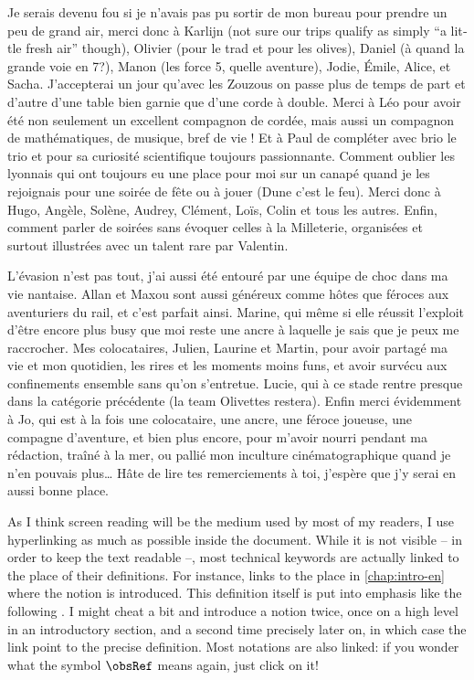 Je serais devenu fou si je n’avais pas pu sortir de mon bureau pour prendre un peu de grand
air, merci donc à Karlijn (\foreignlanguage{english}{not sure our trips
qualify as simply “a little fresh air” though}),
Olivier (pour le trad et pour les olives), Daniel (à quand la grande voie en 7?),
Manon (les force 5, quelle aventure), Jodie, Émile, Alice,
et Sacha. J’accepterai un jour qu’avec les Zouzous on passe plus de temps
de part et d’autre d’une table bien garnie que d’une corde à double.
Merci à Léo pour avoir été non seulement un excellent compagnon de cordée, mais aussi un
compagnon de mathématiques, de musique, bref de vie ! Et à Paul de compléter avec brio
le trio et pour sa curiosité scientifique toujours passionnante.
Comment oublier les lyonnais qui ont toujours eu une place pour moi sur un canapé
quand je les rejoignais pour une soirée de fête ou à jouer (Dune c’est le feu).
Merci donc à Hugo, Angèle, Solène, Audrey, Clément, Loïs, Colin
et tous les autres. 
Enfin, comment parler de soirées sans évoquer celles à la Milleterie, organisées et
surtout illustrées avec un talent rare par Valentin.

L’évasion n’est pas tout, j’ai aussi été entouré par une équipe de choc dans ma vie nantaise.
Allan et Maxou sont aussi généreux comme hôtes que féroces aux aventuriers du rail, et
c’est parfait ainsi.
Marine, qui même si elle réussit l’exploit d’être encore plus busy que moi reste une ancre
à laquelle je sais que je peux me raccrocher.
Mes colocataires, Julien, Laurine et Martin, pour avoir partagé ma
vie et mon quotidien, les rires et les moments moins funs, et avoir survécu aux confinements
ensemble sans qu’on s’entretue. Lucie, qui à ce stade rentre
presque dans la catégorie précédente (la team Olivettes restera).
Enfin merci évidemment à Jo, qui est à la fois une colocataire, une ancre, une féroce joueuse,
une compagne d’aventure, et bien plus encore, pour m’avoir nourri pendant ma rédaction,
traîné à la mer, ou pallié mon inculture cinématographique quand je n’en pouvais plus…
Hâte de lire tes remerciements à toi, j’espère que j’y serai en aussi bonne place.



As I think screen reading will be the medium
used by most of my readers, I use hyperlinking as much as possible
inside the document.
While it is not visible – in order to keep the text readable –,
most technical keywords are actually linked to the
place of their definitions. For instance,  links to
the place in \cref{chap:intro-en} where the notion is introduced.
This definition itself is put into emphasis like the following .
I might cheat a bit and introduce a notion twice, once on a high level in an introductory
section, and a second time precisely later on, in which case the link point to the precise
definition. Most notations are also linked: if you wonder what the symbol $\obsRef$
means again, just click on it!

